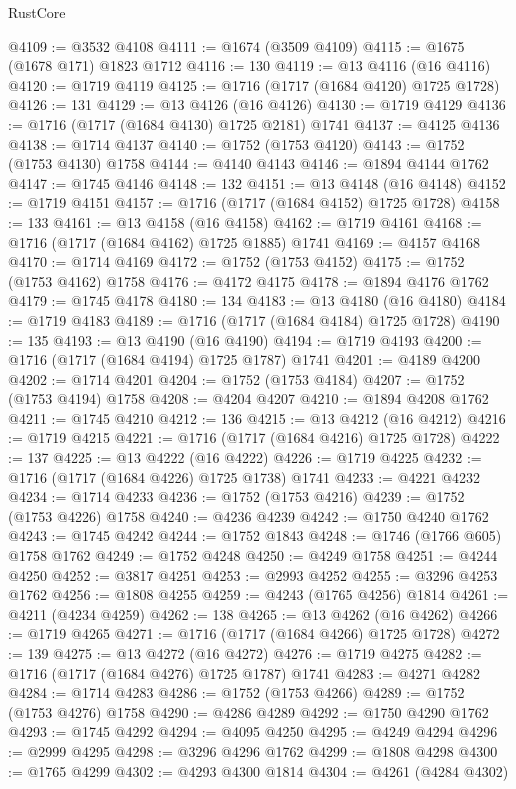 \begin{lexlean}{RustCore}
\begin{coremodule}
@4109 := @3532 @4108
@4111 := @1674 (@3509 @4109)
@4115 := @1675 (@1678 @171) @1823 @1712
@4116 := 130
@4119 := @13 @4116 (@16 @4116)
@4120 := @1719 @4119
@4125 := @1716 (@1717 (@1684 @4120) @1725 @1728)
@4126 := 131
@4129 := @13 @4126 (@16 @4126)
@4130 := @1719 @4129
@4136 := @1716 (@1717 (@1684 @4130) @1725 @2181) @1741
@4137 := @4125 @4136
@4138 := @1714 @4137
@4140 := @1752 (@1753 @4120)
@4143 := @1752 (@1753 @4130) @1758
@4144 := @4140 @4143
@4146 := @1894 @4144 @1762
@4147 := @1745 @4146
@4148 := 132
@4151 := @13 @4148 (@16 @4148)
@4152 := @1719 @4151
@4157 := @1716 (@1717 (@1684 @4152) @1725 @1728)
@4158 := 133
@4161 := @13 @4158 (@16 @4158)
@4162 := @1719 @4161
@4168 := @1716 (@1717 (@1684 @4162) @1725 @1885) @1741
@4169 := @4157 @4168
@4170 := @1714 @4169
@4172 := @1752 (@1753 @4152)
@4175 := @1752 (@1753 @4162) @1758
@4176 := @4172 @4175
@4178 := @1894 @4176 @1762
@4179 := @1745 @4178
@4180 := 134
@4183 := @13 @4180 (@16 @4180)
@4184 := @1719 @4183
@4189 := @1716 (@1717 (@1684 @4184) @1725 @1728)
@4190 := 135
@4193 := @13 @4190 (@16 @4190)
@4194 := @1719 @4193
@4200 := @1716 (@1717 (@1684 @4194) @1725 @1787) @1741
@4201 := @4189 @4200
@4202 := @1714 @4201
@4204 := @1752 (@1753 @4184)
@4207 := @1752 (@1753 @4194) @1758
@4208 := @4204 @4207
@4210 := @1894 @4208 @1762
@4211 := @1745 @4210
@4212 := 136
@4215 := @13 @4212 (@16 @4212)
@4216 := @1719 @4215
@4221 := @1716 (@1717 (@1684 @4216) @1725 @1728)
@4222 := 137
@4225 := @13 @4222 (@16 @4222)
@4226 := @1719 @4225
@4232 := @1716 (@1717 (@1684 @4226) @1725 @1738) @1741
@4233 := @4221 @4232
@4234 := @1714 @4233
@4236 := @1752 (@1753 @4216)
@4239 := @1752 (@1753 @4226) @1758
@4240 := @4236 @4239
@4242 := @1750 @4240 @1762
@4243 := @1745 @4242
@4244 := @1752 @1843
@4248 := @1746 (@1766 @605) @1758 @1762
@4249 := @1752 @4248
@4250 := @4249 @1758
@4251 := @4244 @4250
@4252 := @3817 @4251
@4253 := @2993 @4252
@4255 := @3296 @4253 @1762
@4256 := @1808 @4255
@4259 := @4243 (@1765 @4256) @1814
@4261 := @4211 (@4234 @4259)
@4262 := 138
@4265 := @13 @4262 (@16 @4262)
@4266 := @1719 @4265
@4271 := @1716 (@1717 (@1684 @4266) @1725 @1728)
@4272 := 139
@4275 := @13 @4272 (@16 @4272)
@4276 := @1719 @4275
@4282 := @1716 (@1717 (@1684 @4276) @1725 @1787) @1741
@4283 := @4271 @4282
@4284 := @1714 @4283
@4286 := @1752 (@1753 @4266)
@4289 := @1752 (@1753 @4276) @1758
@4290 := @4286 @4289
@4292 := @1750 @4290 @1762
@4293 := @1745 @4292
@4294 := @4095 @4250
@4295 := @4249 @4294
@4296 := @2999 @4295
@4298 := @3296 @4296 @1762
@4299 := @1808 @4298
@4300 := @1765 @4299
@4302 := @4293 @4300 @1814
@4304 := @4261 (@4284 @4302)

\end{coremodule}
\end{lexlean}

